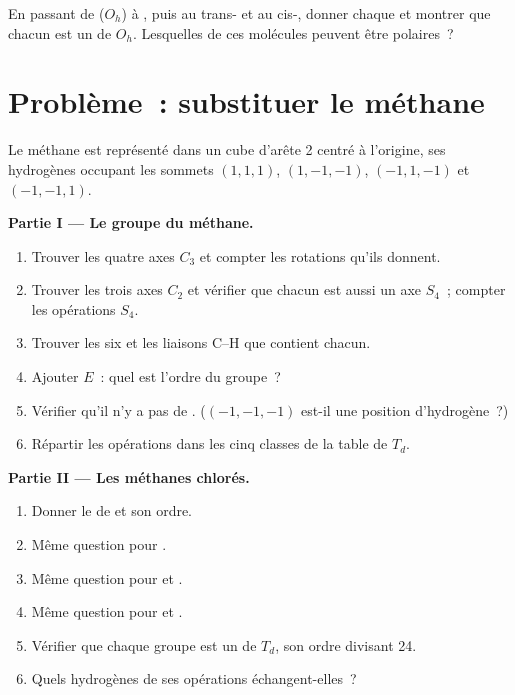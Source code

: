 \begin{exercise}[$\star\star\star$]\label{exo:b3:point-groups:12}
En passant de  ($O_h$) à , puis au trans-
et au cis-, donner chaque  et montrer que
chacun est un  de
$O_h$. Lesquelles de ces molécules peuvent être polaires~?
\end{exercise}

\section{Problème~: substituer le méthane}

\begin{problem}
\label{pb:b3:point-groups:1}
Le méthane est représenté dans un cube d'arête 2 centré à l'origine, ses
hydrogènes occupant les sommets $(1,1,1)$, $(1,-1,-1)$, $(-1,1,-1)$ et
$(-1,-1,1)$.

\medskip\noindent\textbf{Partie I --- Le groupe du méthane.}
\begin{enumerate}
  \item Trouver les quatre axes $C_3$ et compter les rotations qu'ils
        donnent.
  \item Trouver les trois axes $C_2$ et vérifier que chacun est aussi un
        axe $S_4$~; compter les opérations $S_4$.
  \item Trouver les six  et les liaisons C--H que
        contient chacun.
  \item Ajouter $E$~: quel est l'ordre du groupe~?
  \item Vérifier qu'il n'y a pas de . ($(-1,-1,-1)$
        est-il une position d'hydrogène~?)
  \item Répartir les opérations dans les cinq classes de la table de $T_d$.
\end{enumerate}

\medskip\noindent\textbf{Partie II --- Les méthanes chlorés.}
\begin{enumerate}[resume]
  \item Donner le  de  et son ordre.
  \item Même question pour .
  \item Même question pour  et .
  \item Même question pour  et .
  \item Vérifier que chaque groupe est un  de $T_d$, son ordre
        divisant 24.
  \item Quels hydrogènes de  ses opérations échangent-elles~?
\end{enumerate}


\end{problem}
